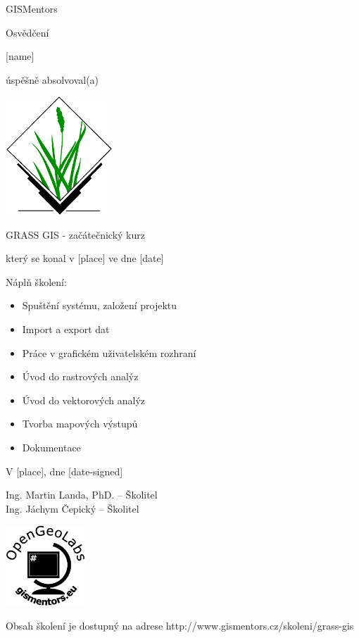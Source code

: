 \documentclass[12pt, a4paper]{letter}
\begin{document}
\pagestyle{empty}
\begin{center}

{\Large GISMentors}

{\Huge Osvědčení}

{\Large [name]}

úspěšně absolvoval(a)

\includegraphics[width=0.30\textwidth]{../images/grasslogo_vector.eps}

{\Large GRASS GIS - začátečnický kurz}

který se konal v [place] ve dne [date]
\end{center}

Náplň školení:

\begin{itemize}
    \item Spuštění systému, založení projektu
    \item Import a export dat
    \item Práce v grafickém uživatelském rozhraní
    \item Úvod do rastrových analýz
    \item Úvod do vektorových analýz
    \item Tvorba mapových výstupů
    \item Dokumentace
\end{itemize}

\vfill
\parbox{7cm}{

    V [place], dne [date-signed]\\

\vfill

    Ing. Martin Landa, PhD. -- Školitel\\

\vfill
    Ing. Jáchym Čepický -- Školitel
}
\hfill
\parbox{3cm}{
    \includegraphics[width=3cm]{../images/placka.eps}
}

\vfill

\begin{center}
{\footnotesize Obsah školení je dostupný na adrese
http://www.gismentors.cz/skoleni/grass-gis}
\end{center}
\end{document}

